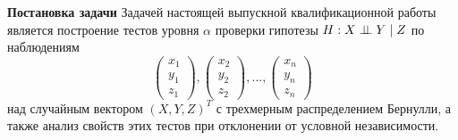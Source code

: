 \textbf{Постановка задачи} \quad
Задачей настоящей выпускной квалификационной работы 
является построение тестов уровня $\alpha$ 
проверки гипотезы $H: X \perp\!\!\!\perp Y \mid Z$
по наблюдениям
$$
\begin{pmatrix}
    x_1 \\
    y_1 \\
    z_1
\end{pmatrix},
\begin{pmatrix}
    x_2 \\
    y_2 \\
    z_2
\end{pmatrix}, \ldots,
\begin{pmatrix}
    x_n \\
    y_n \\
    z_n
\end{pmatrix}
$$ над случайным вектором $(X,Y,Z)^T$ с
трехмерным распределением Бернулли, а также
анализ свойств этих тестов при отклонении от условной независимости.
